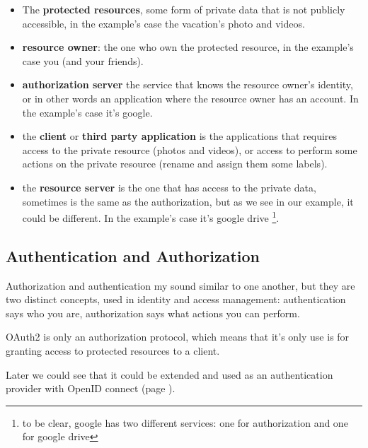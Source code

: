 \documentclass[11pt]{style}
\begin{document}
\begin{itemize}
    \item The \textbf{protected resources}, some form of private data that is
        not publicly accessible, in the example's case the vacation's photo and
        videos.
    \item \textbf{resource owner}: the one who own the protected resource, in
        the example's case you (and your friends).
    \item \textbf{authorization server} the service that knows the resource
        owner's identity, or in other words an application where the resource
        owner has an account. In the example's case it's google.
    \item the \textbf{client} or \textbf{third party application} is the
        applications that requires access to the private resource (photos and
        videos), or access to perform some actions on the private resource
        (rename and assign them some labels).
    \item the \textbf{resource server} is the one that has access to the private
        data, sometimes is the same as the authorization, but as we see in our
        example, it could be different.
        In the example's case it's google drive \footnote{to be clear, google
        has two different services: one for authorization and one for google
        drive}.
\end{itemize}

\subsection{Authentication and Authorization}
Authorization and authentication my sound similar to one another, but they are
two distinct concepts, used in identity and access management:
authentication says who you are, authorization says what actions you can
perform.

OAuth2 is only an authorization protocol, which means that it's only use is for
granting access to protected resources to a client.

Later we could see that it could be extended and used as an authentication
provider with OpenID connect (page \pageref{openid}).
\end{document}
